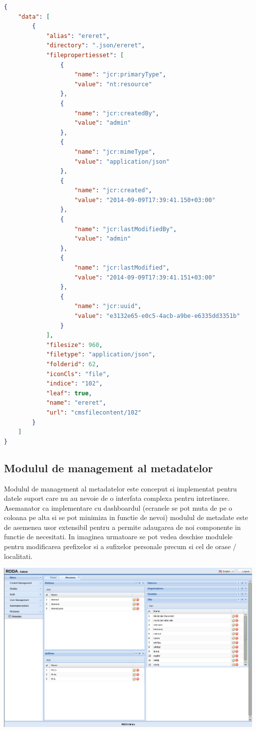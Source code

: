 \begin{lstlisting}[language=json,firstnumber=1]
{ 
    "data": [
        {
            "alias": "ereret",
            "directory": ".json/ereret",
            "filepropertiesset": [
                {
                    "name": "jcr:primaryType",
                    "value": "nt:resource"
                },
                {
                    "name": "jcr:createdBy",
                    "value": "admin"
                },
                {
                    "name": "jcr:mimeType",
                    "value": "application/json"
                },
                {
                    "name": "jcr:created",
                    "value": "2014-09-09T17:39:41.150+03:00"
                },
                {
                    "name": "jcr:lastModifiedBy",
                    "value": "admin"
                },
                {
                    "name": "jcr:lastModified",
                    "value": "2014-09-09T17:39:41.151+03:00"
                },
                {
                    "name": "jcr:uuid",
                    "value": "e3132e65-e0c5-4acb-a9be-e6335dd3351b"
                }
            ],
            "filesize": 960,
            "filetype": "application/json",
            "folderid": 62,
            "iconCls": "file",
            "indice": "102",
            "leaf": true,
            "name": "ereret",
            "url": "cmsfilecontent/102"
        }
    ]
}  
\end{lstlisting}   


\subsection{Modulul de management al metadatelor}

Modulul de management al metadatelor este conceput si implementat pentru datele suport care nu au nevoie de o interfata complexa pentru intretinere. Asemanator ca implementare cu dashboardul (ecranele se pot muta de pe o coloana pe alta si se pot minimiza in functie de nevoi) modulul de metadate este de asemenea usor extensibil pentru a permite adaugarea de noi componente in functie de necesitati. In imaginea urmatoare se pot vedea deschise modulele pentru modificarea prefixelor si a sufixelor personale precum si cel de orase / localitati.

\includegraphics[width=16cm]{img/metadata}

